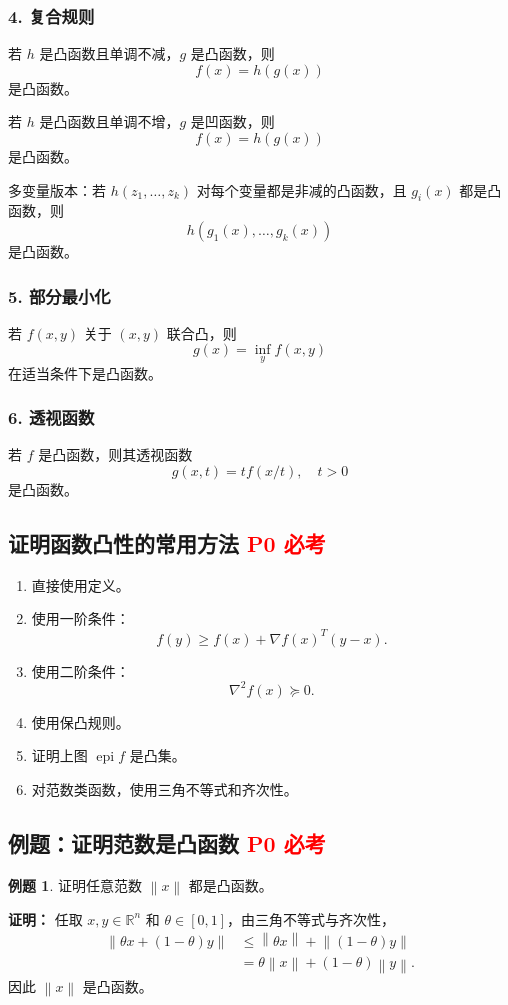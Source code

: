 \documentclass[11pt,a4paper]{ctexart}
\newcommand{\R}{\mathbb{R}}
\newcommand{\epi}{\operatorname{epi}}
\newcommand{\norm}[1]{\left\lVert #1 \right\rVert}
\newcommand{\Pzero}{\textcolor{red}{\textbf{P0 必考}}}
\theoremstyle{definition}
\newtheorem{example}{例题}[section]
\theoremstyle{plain}
\theoremstyle{remark}
\begin{document}
\subsubsection*{4. 复合规则}

若 $h$ 是凸函数且单调不减，$g$ 是凸函数，则
\[
    f(x)=h(g(x))
\]
是凸函数。

若 $h$ 是凸函数且单调不增，$g$ 是凹函数，则
\[
    f(x)=h(g(x))
\]
是凸函数。

多变量版本：若 $h(z_1,\dots,z_k)$ 对每个变量都是非减的凸函数，且 $g_i(x)$ 都是凸函数，则
\[
    h(g_1(x),\dots,g_k(x))
\]
是凸函数。

\subsubsection*{5. 部分最小化}

若 $f(x,y)$ 关于 $(x,y)$ 联合凸，则
\[
    g(x)=\inf_y f(x,y)
\]
在适当条件下是凸函数。

\subsubsection*{6. 透视函数}

若 $f$ 是凸函数，则其透视函数
\[
    g(x,t)=t f(x/t),\quad t>0
\]
是凸函数。

\subsection{证明函数凸性的常用方法 \Pzero}

\begin{enumerate}[label=\arabic*.]
    \item 直接使用定义。
    \item 使用一阶条件：
    \[
        f(y)\ge f(x)+\nabla f(x)^T(y-x).
    \]
    \item 使用二阶条件：
    \[
        \nabla^2 f(x)\succeq0.
    \]
    \item 使用保凸规则。
    \item 证明上图 $\epi f$ 是凸集。
    \item 对范数类函数，使用三角不等式和齐次性。
\end{enumerate}

\subsection{例题：证明范数是凸函数 \Pzero}

\begin{example}
证明任意范数 $\norm{x}$ 都是凸函数。

\textbf{证明：}
任取 $x,y\in\R^n$ 和 $\theta\in[0,1]$，由三角不等式与齐次性，
\[
\begin{aligned}
    \norm{\theta x+(1-\theta)y}
    &\le
    \norm{\theta x}+\norm{(1-\theta)y}\\
    &=
    \theta\norm{x}+(1-\theta)\norm{y}.
\end{aligned}
\]
因此 $\norm{x}$ 是凸函数。
\end{example}
\end{document}
